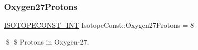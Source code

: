 \subsubsection{\texorpdfstring{Oxygen27\+Protons}{Oxygen27Protons}}
{\footnotesize\ttfamily \mbox{\hyperlink{group___isotope_const-_macros_ga5f18360b3e99483a35c32d789e62621c}{I\+S\+O\+T\+O\+P\+E\+C\+O\+N\+S\+T\+\_\+\+I\+NT}} Isotope\+Const\+::\+Oxygen27\+Protons = 8}

\$ \$ Protons in Oxygen-\/27. 